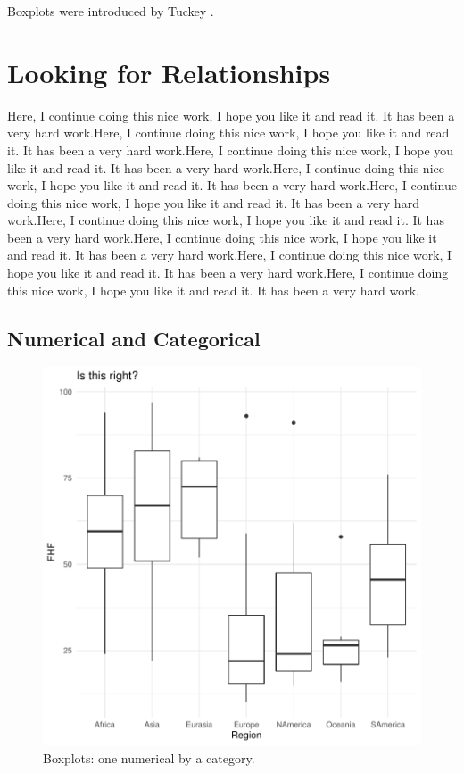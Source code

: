 \documentclass[11pt]{article}
\begin{document}
Boxplots were introduced by Tuckey \cite{tukey_exploratory_1977}.

\section{Looking for Relationships}\label{bivar}


Here, I continue doing this nice work, I hope you like it and read it. It has been a very hard work.Here, I continue doing this nice work, I hope you like it and read it. It has been a very hard work.Here, I continue doing this nice work, I hope you like it and read it. It has been a very hard work.Here, I continue doing this nice work, I hope you like it and read it. It has been a very hard work.Here, I continue doing this nice work, I hope you like it and read it. It has been a very hard work.Here, I continue doing this nice work, I hope you like it and read it. It has been a very hard work.Here, I continue doing this nice work, I hope you like it and read it. It has been a very hard work.Here, I continue doing this nice work, I hope you like it and read it. It has been a very hard work.Here, I continue doing this nice work, I hope you like it and read it. It has been a very hard work.

\subsection{Numerical and  Categorical}\label{binumcat}



\begin{figure}[h]
\centering
\begin{adjustbox}{width=7cm,height=7cm} 
\includegraphics{PaperInR_8-numcat_plot}
\end{adjustbox}
\caption{Boxplots: one numerical by a category.}  
\label{numcat_plot} 
\end{figure}
\end{document}

